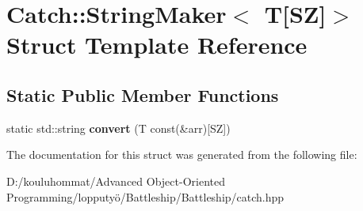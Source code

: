 \hypertarget{struct_catch_1_1_string_maker_3_01_t[_s_z]_4}{}\section{Catch\+:\+:String\+Maker$<$ T\mbox{[}SZ\mbox{]}$>$ Struct Template Reference}
\label{struct_catch_1_1_string_maker_3_01_t[_s_z]_4}
\subsection*{Static Public Member Functions}
\begin{DoxyCompactItemize}
\item 
\mbox{\label{struct_catch_1_1_string_maker_3_01_t[_s_z]_4_a3698cea2c24d8649ec9ecb5fa679eeb7}} 
static std\+::string {\bfseries convert} (T const(\&arr)\mbox{[}SZ\mbox{]})
\end{DoxyCompactItemize}


The documentation for this struct was generated from the following file\+:\begin{DoxyCompactItemize}
\item 
D\+:/kouluhommat/\+Advanced Object-\/\+Oriented Programming/lopputyö/\+Battleship/\+Battleship/catch.\+hpp\end{DoxyCompactItemize}

